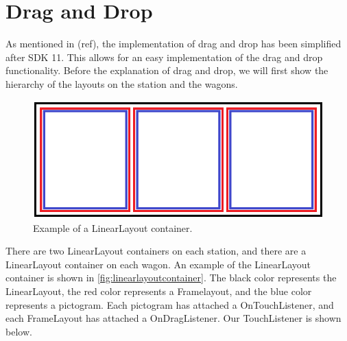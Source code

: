 \section{Drag and Drop}
As mentioned in (ref),  the implementation of drag and drop has been simplified after SDK 11. This allows for an easy implementation of the drag and drop functionality. Before the explanation of drag and drop, we will first show the hierarchy of the layouts on the station and the wagons.
\begin{figure}[H]
\centering
\includegraphics[width=0.9\linewidth]{img/layoutexample.png}%
\caption{Example of a LinearLayout container.}
\label{fig:linearlayoutcontainer}
\end{figure}
There are two LinearLayout containers on each station, and there are a LinearLayout container on each wagon. An example of the LinearLayout container is shown in \autoref{fig:linearlayoutcontainer}. The black color represents the LinearLayout, the red color represents a Framelayout, and the blue color represents a pictogram. Each pictogram has attached a OnTouchListener, and each FrameLayout has attached a OnDragListener. Our TouchListener is shown below.


